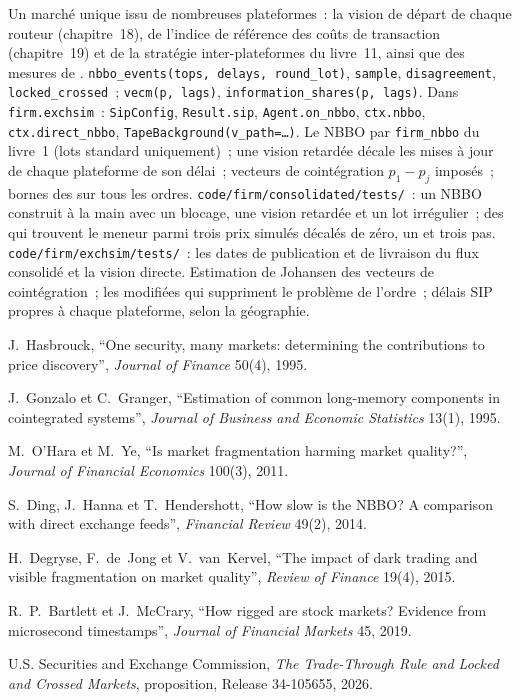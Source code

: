 \begin{build}
 Un marché unique issu de nombreuses plateformes~: la vision de départ de chaque routeur (chapitre~18), de l'indice de référence des coûts de transaction (chapitre~19) et de la
stratégie inter-plateformes du livre~11, ainsi que des mesures de .
 \texttt{nbbo\_events(tops, delays, round\_lot)}, \texttt{sample}, \texttt{disagreement}, \texttt{locked\_crossed}~;
\texttt{vecm(p, lags)}, \texttt{information\_shares(p, lags)}. Dans \texttt{firm.exchsim}~: \texttt{SipConfig}, \texttt{Result.sip},
\texttt{Agent.on\_nbbo}, \texttt{ctx.nbbo}, \texttt{ctx.direct\_nbbo}, \texttt{TapeBackground(v\_path=\dots)}.
 Le NBBO par \texttt{firm\_nbbo} du livre~1 (lots standard uniquement)~; une vision retardée décale les mises à jour de chaque plateforme de son délai~; vecteurs de cointégration
$p_1-p_j$ imposés~; bornes des  sur tous les ordres.
 \texttt{code/firm/consolidated/tests/}~: un NBBO construit à la main avec un blocage, une vision retardée et un lot irrégulier~; des  qui
trouvent le meneur parmi trois prix simulés décalés de zéro, un et trois pas. \texttt{code/firm/exchsim/tests/}~: les dates de publication et de livraison du flux consolidé
et la vision directe.
 Estimation de Johansen des vecteurs de cointégration~; les  modifiées qui suppriment le problème de l'ordre~; délais SIP propres
à chaque plateforme, selon la géographie.
\end{build}

\begin{omsources}
\item J.~Hasbrouck, ``One security, many markets: determining the contributions to price discovery'', \emph{Journal of Finance} 50(4), 1995.
\item J.~Gonzalo et C.~Granger, ``Estimation of common long-memory components in cointegrated systems'', \emph{Journal of Business and Economic
Statistics} 13(1), 1995.
\item M.~O'Hara et M.~Ye, ``Is market fragmentation harming market quality?'', \emph{Journal of Financial Economics} 100(3), 2011.
\item S.~Ding, J.~Hanna et T.~Hendershott, ``How slow is the NBBO? A comparison with direct exchange feeds'', \emph{Financial Review} 49(2), 2014.
\item H.~Degryse, F.~de~Jong et V.~van~Kervel, ``The impact of dark trading and visible fragmentation on market quality'', \emph{Review of Finance}
19(4), 2015.
\item R.~P.~Bartlett et J.~McCrary, ``How rigged are stock markets? Evidence from microsecond timestamps'', \emph{Journal of Financial Markets} 45, 2019.
\item U.S. Securities and Exchange Commission, \emph{The Trade-Through Rule and Locked and Crossed Markets}, proposition, Release 34-105655, 2026.
\end{omsources}

